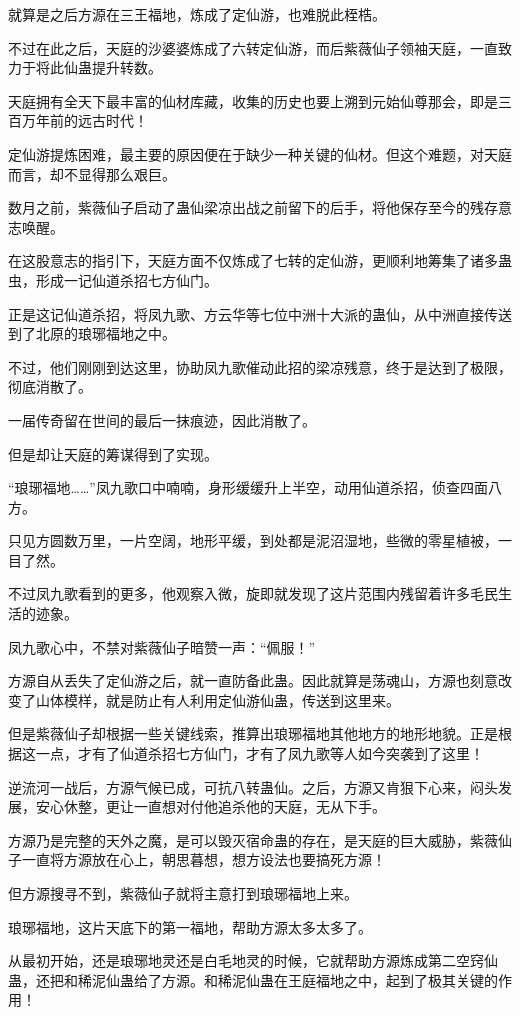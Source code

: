 \begin{this_body}
就算是之后方源在三王福地，炼成了定仙游，也难脱此桎梏。

不过在此之后，天庭的沙婆婆炼成了六转定仙游，而后紫薇仙子领袖天庭，一直致力于将此仙蛊提升转数。

天庭拥有全天下最丰富的仙材库藏，收集的历史也要上溯到元始仙尊那会，即是三百万年前的远古时代！

定仙游提炼困难，最主要的原因便在于缺少一种关键的仙材。但这个难题，对天庭而言，却不显得那么艰巨。

数月之前，紫薇仙子启动了蛊仙梁凉出战之前留下的后手，将他保存至今的残存意志唤醒。

在这股意志的指引下，天庭方面不仅炼成了七转的定仙游，更顺利地筹集了诸多蛊虫，形成一记仙道杀招七方仙门。

正是这记仙道杀招，将凤九歌、方云华等七位中洲十大派的蛊仙，从中洲直接传送到了北原的琅琊福地之中。

不过，他们刚刚到达这里，协助凤九歌催动此招的梁凉残意，终于是达到了极限，彻底消散了。

一届传奇留在世间的最后一抹痕迹，因此消散了。

但是却让天庭的筹谋得到了实现。

“琅琊福地……”凤九歌口中喃喃，身形缓缓升上半空，动用仙道杀招，侦查四面八方。

只见方圆数万里，一片空阔，地形平缓，到处都是泥沼湿地，些微的零星植被，一目了然。

不过凤九歌看到的更多，他观察入微，旋即就发现了这片范围内残留着许多毛民生活的迹象。

凤九歌心中，不禁对紫薇仙子暗赞一声：“佩服！”

方源自从丢失了定仙游之后，就一直防备此蛊。因此就算是荡魂山，方源也刻意改变了山体模样，就是防止有人利用定仙游仙蛊，传送到这里来。

但是紫薇仙子却根据一些关键线索，推算出琅琊福地其他地方的地形地貌。正是根据这一点，才有了仙道杀招七方仙门，才有了凤九歌等人如今突袭到了这里！

逆流河一战后，方源气候已成，可抗八转蛊仙。之后，方源又肯狠下心来，闷头发展，安心休整，更让一直想对付他追杀他的天庭，无从下手。

方源乃是完整的天外之魔，是可以毁灭宿命蛊的存在，是天庭的巨大威胁，紫薇仙子一直将方源放在心上，朝思暮想，想方设法也要搞死方源！

但方源搜寻不到，紫薇仙子就将主意打到琅琊福地上来。

琅琊福地，这片天底下的第一福地，帮助方源太多太多了。

从最初开始，还是琅琊地灵还是白毛地灵的时候，它就帮助方源炼成第二空窍仙蛊，还把和稀泥仙蛊给了方源。和稀泥仙蛊在王庭福地之中，起到了极其关键的作用！


\end{this_body}

